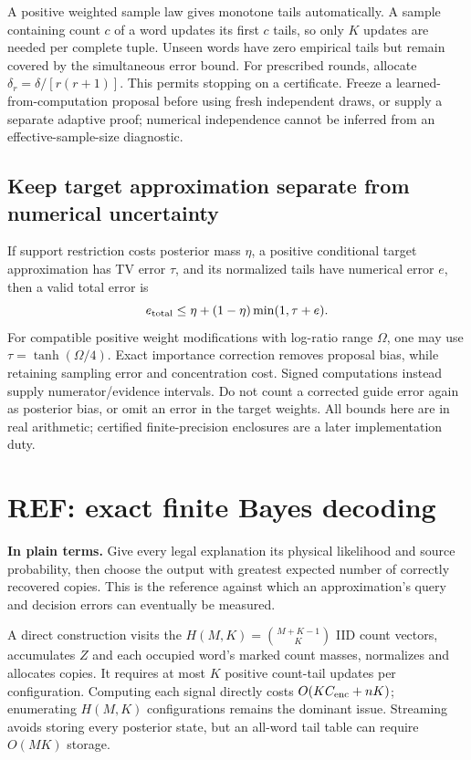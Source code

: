 \documentclass[10pt,a4paper]{article}
\begin{document}
A positive weighted sample law gives monotone tails automatically. A sample containing count $c$ of a
word updates its first $c$ tails, so only $K$ updates are needed per complete tuple.
Unseen words have zero empirical tails but remain covered by the simultaneous error bound.
For prescribed rounds, allocate $\delta_r=\delta/[r(r+1)]$. This permits stopping on a certificate.
Freeze a learned-from-computation proposal before using fresh independent draws, or supply a separate
adaptive proof; numerical independence cannot be inferred from an effective-sample-size diagnostic.

\newpage
\subsection{Keep target approximation separate from numerical uncertainty}
If support restriction costs posterior mass $\eta$, a positive conditional target approximation has TV
error $\tau$, and its normalized tails have numerical error $e$, then a valid total error is
\begin{equation}
 e_{\rm total}\leq\eta+(1-\eta)\min(1,\tau+e).
 \label{eq:ledger}
\end{equation}
For compatible positive weight modifications with log-ratio range $\Omega$, one may use
$\tau=\tanh(\Omega/4)$. Exact importance correction removes proposal bias, while retaining sampling
error and concentration cost. Signed computations instead supply numerator/evidence intervals.
Do not count a corrected guide error again as posterior bias, or omit an error in the target weights.
All bounds here are in real arithmetic; certified finite-precision enclosures are a later implementation duty.

\section{REF: exact finite Bayes decoding}
\label{sec:reference}
\textbf{In plain terms.} Give every legal explanation its physical likelihood and source probability,
then choose the output with greatest expected number of correctly recovered copies.
This is the reference against which an approximation's query and decision errors can eventually be measured.

A direct construction visits the $H(M,K)=\binom{M+K-1}{K}$ IID count vectors, accumulates $Z$ and each
occupied word's marked count masses, normalizes and allocates copies. It requires at most $K$ positive
count-tail updates per configuration. Computing each signal directly costs $O(KC_{\rm enc}+nK)$;
enumerating $H(M,K)$ configurations remains the dominant issue. Streaming avoids storing every posterior
state, but an all-word tail table can require $O(MK)$ storage.
\end{document}
